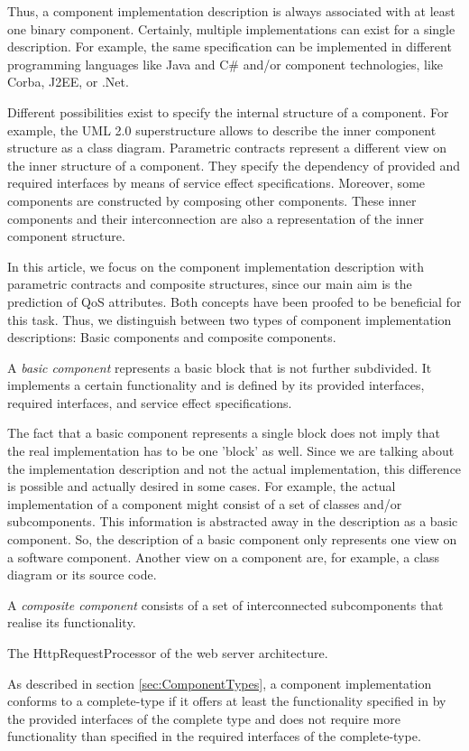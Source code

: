 Thus, a component implementation description is always associated with at least
one binary component. Certainly, multiple implementations
can exist for a single description. For example, the same
specification can be implemented in different programming languages like Java
and C\# and/or component technologies, like Corba, J2EE, or .Net. 

Different possibilities exist to specify the internal structure of a
component. For example, the UML 2.0 superstructure allows to describe the
inner component structure as a class diagram.
Parametric contracts represent a different view
on the inner structure of a component. They specify the dependency of provided
and required interfaces by means of service effect specifications.
Moreover, some components are constructed by composing other components. These
inner components and their interconnection are also a representation of the
inner component structure.

In this article, we focus on the component implementation description with
parametric contracts and composite structures, since our main aim is the
prediction of QoS attributes. Both concepts have been proofed to be beneficial
for this task. Thus, we distinguish between two types of component
implementation descriptions: Basic components and composite components.

A \emph{basic component} represents a basic block that is not further
subdivided. It implements a certain functionality and is defined by its provided
interfaces, required interfaces, and service effect specifications.

The fact that a basic component represents a single block does not imply that
the real implementation has to be one 'block' as well. Since we are talking
about the implementation description and not the actual implementation, this
difference is possible and actually desired in some cases. For example, the
actual implementation of a component might consist of a set of classes and/or
subcomponents. This information is abstracted away in the description as a basic
component. So, the description of a basic component only represents one view on
a software component. Another view on a component are, for example, a class
diagram or its source code.

A \emph{composite component} consists of a set of interconnected subcomponents
that realise its functionality. 

The HttpRequestProcessor of the web server architecture.

As described in section \ref{sec:ComponentTypes}, a component implementation
conforms to a complete-type if it offers at least the functionality specified
in by the provided interfaces of the complete type and does not require more
functionality than specified in the required interfaces of the complete-type.

